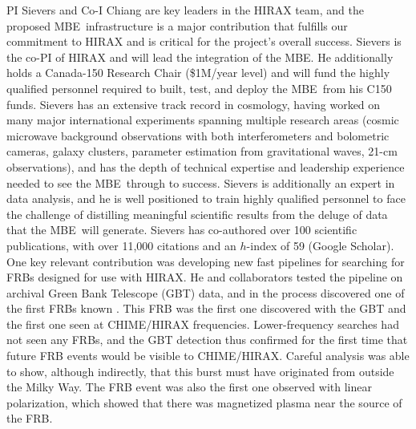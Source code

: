\documentclass[11pt]{article}
\newcommand{\mbe}{{\rm MBE}}
\begin{document}
PI Sievers and Co-I Chiang are key leaders in the HIRAX team, and the
proposed \mbe\ infrastructure is a major contribution that fulfills
our commitment to HIRAX and is critical for the project's overall
success.  Sievers is the co-PI of HIRAX and will lead the integration
of the \mbe.  He additionally holds a Canada-150 Research Chair
(\$1M/year level) and will fund the highly qualified personnel
required to built, test, and deploy the \mbe\ from his C150 funds.
Sievers has an extensive track record in cosmology, having worked on
many major international experiments spanning multiple research areas
(cosmic microwave background observations with both interferometers
and bolometric cameras, galaxy clusters, parameter estimation from
gravitational waves, 21-cm observations), and has the depth of
technical expertise and leadership experience needed to see the
\mbe\ through to success.  Sievers is additionally an expert in data
analysis, and he is well positioned to train highly qualified
personnel to face the challenge of distilling meaningful scientific
results from the deluge of data that the \mbe\ will generate.  Sievers
has co-authored over 100 scientific publications, with over 11,000
citations and an $h$-index of 59 (Google Scholar).  One key relevant
contribution was developing new fast pipelines for searching for FRBs
designed for use with HIRAX.  He and collaborators tested the pipeline
on archival Green Bank Telescope (GBT) data, and in the process
discovered one of the first FRBs known \citep{Masui15}.  This FRB was
the first one discovered with the GBT and the first one seen at
CHIME/HIRAX frequencies.  Lower-frequency searches had not seen any
FRBs, and the GBT detection thus confirmed for the first time that
future FRB events would be visible to CHIME/HIRAX.  Careful analysis
was able to show, although indirectly, that this burst must have
originated from outside the Milky Way.  The FRB event was also the
first one observed with linear polarization, which showed that there
was magnetized plasma near the source of the FRB.
\end{document}
